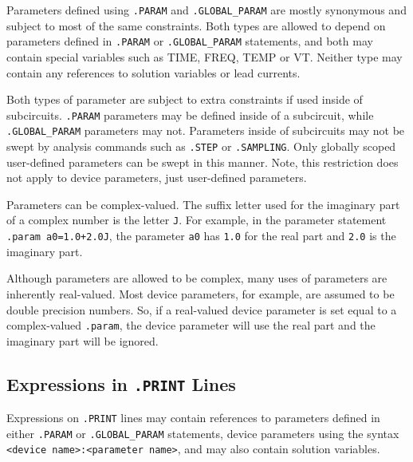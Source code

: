 Parameters defined using \texttt{.PARAM} and \texttt{.GLOBAL\_PARAM} are 
mostly synonymous and subject to most of the same constraints.
Both types are 
allowed to depend on parameters defined in \texttt{.PARAM} or
\texttt{.GLOBAL\_PARAM} statements, and both may contain special variables
such as \textrm{TIME}, \textrm{FREQ}, \textrm{TEMP} or \textrm{VT}.  Neither type
may contain any references to solution variables or lead currents.



Both types of parameter are subject to extra constraints if used inside of subcircuits.  
\texttt{.PARAM} parameters may be defined inside of a subcircuit, while \texttt{.GLOBAL\_PARAM} 
parameters may not.  Parameters inside of subcircuits may not be swept by 
analysis commands such as \texttt{.STEP} or \texttt{.SAMPLING}.  Only globally 
scoped user-defined parameters can be swept in this manner.  Note, this restriction 
does not apply to device parameters, just user-defined parameters.

Parameters can be complex-valued.  The suffix letter used for the imaginary 
part of a complex number is the letter \texttt{J}.  For example, in the parameter statement 
\texttt{.param a0=1.0+2.0J}, the parameter \texttt{a0} has \texttt{1.0} for the real part and 
\texttt{2.0} is the imaginary part.  

Although parameters are allowed
to be complex, many uses of parameters are inherently real-valued.  Most 
device parameters, for example, are assumed to be double precision numbers. So,
if a real-valued device parameter is set equal to a complex-valued \texttt{.param}, 
the device parameter will use the real part and the imaginary part
will be ignored.

\subsection{Expressions in \texttt{.PRINT} Lines}

Expressions on \texttt{.PRINT} lines may contain references to
parameters defined in either \texttt{.PARAM} or
\texttt{.GLOBAL\_PARAM} statements, device parameters using the syntax
\texttt{<device name>:<parameter name>}, and may also contain solution
variables.


